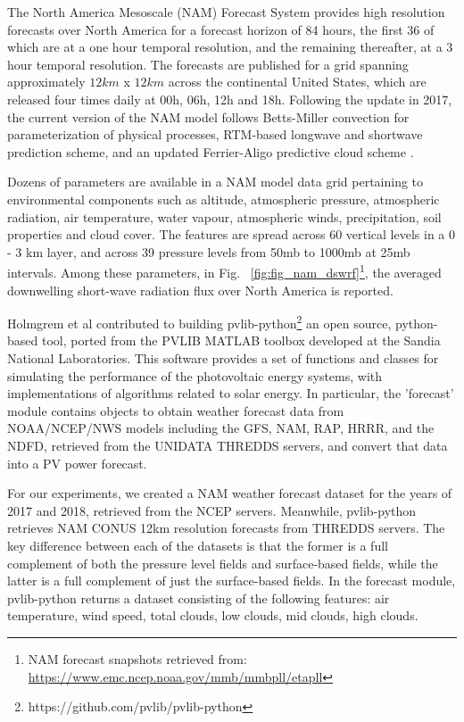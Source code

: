 \par The North America Mesoscale (NAM) Forecast System provides high resolution forecasts over North America for a forecast horizon of 84 hours, the first 36 of which are at a one hour temporal resolution, and the remaining thereafter, at a 3 hour temporal resolution. The forecasts are published for a grid spanning approximately $12km$ x $12 km$ across the continental United States, which are released four times daily at 00h, 06h, 12h and 18h. Following the update in 2017, the current version of the NAM model follows Betts-Miller convection for parameterization of physical processes, RTM-based longwave and shortwave prediction scheme, and an updated Ferrier-Aligo predictive cloud scheme \cite{multimodel_cloud}.

\par Dozens of parameters are available in a NAM model data grid pertaining to environmental components such as altitude, atmospheric pressure, atmospheric radiation, air temperature, water vapour, atmospheric winds, precipitation, soil properties and cloud cover. The features are spread across 60 vertical levels in a 0 - 3 km layer, and across 39 pressure levels from 50mb to 1000mb at 25mb intervals. Among these parameters, in Fig. ~\ref{fig:fig_nam_dswrf}\footnote{NAM forecast snapshots retrieved from: \url{https://www.emc.ncep.noaa.gov/mmb/mmbpll/etapll}}, the averaged downwelling short-wave radiation flux over North America is reported.

Holmgrem et al \cite{pvlib_Holmgren2018} contributed to building pvlib-python\footnote{https://github.com/pvlib/pvlib-python} an open source, python-based tool, ported from the PVLIB MATLAB toolbox developed at the Sandia National Laboratories. This software provides a set of functions and classes for simulating the performance of the photovoltaic energy systems, with implementations of algorithms related to solar energy. In particular, the 'forecast' module contains objects to obtain weather forecast data from NOAA/NCEP/NWS models including the GFS, NAM, RAP, HRRR, and the NDFD, retrieved from the UNIDATA THREDDS servers, and convert that data into a PV power forecast. 

\par For our experiments, we created a NAM weather forecast dataset for the years of 2017 and 2018, retrieved from the NCEP servers. Meanwhile, pvlib-python retrieves NAM CONUS 12km resolution forecasts from THREDDS servers. The key difference between each of the datasets is that the former is a full complement of both the pressure level fields and surface-based fields, while the latter is a full complement of just the surface-based fields. In the forecast module, pvlib-python returns a dataset consisting of the following features: air temperature, wind speed, total clouds, low clouds, mid clouds, high clouds. 

